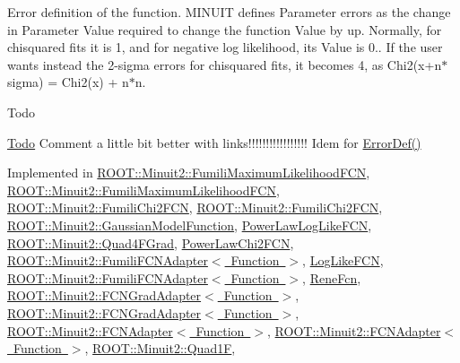 Error definition of the function. M\+I\+N\+U\+IT defines Parameter errors as the change in Parameter Value required to change the function Value by up. Normally, for chisquared fits it is 1, and for negative log likelihood, its Value is 0.. If the user wants instead the 2-\/sigma errors for chisquared fits, it becomes 4, as Chi2(x+n$\ast$sigma) = Chi2(x) + n$\ast$n.

\begin{DoxyRefDesc}{Todo}
\item[\mbox{\hyperlink{todo__todo000001}{Todo}}]Comment a little bit better with links!!!!!!!!!!!!!!!!! Idem for \mbox{\hyperlink{classROOT_1_1Minuit2_1_1FCNBase_ac4592475c58a65b037ba97ab5f3cba10}{Error\+Def()}}\end{DoxyRefDesc}


Implemented in \mbox{\hyperlink{classROOT_1_1Minuit2_1_1FumiliMaximumLikelihoodFCN_ab945da701895bfba143da08f76ba2d05}{R\+O\+O\+T\+::\+Minuit2\+::\+Fumili\+Maximum\+Likelihood\+F\+CN}}, \mbox{\hyperlink{classROOT_1_1Minuit2_1_1FumiliMaximumLikelihoodFCN_ab945da701895bfba143da08f76ba2d05}{R\+O\+O\+T\+::\+Minuit2\+::\+Fumili\+Maximum\+Likelihood\+F\+CN}}, \mbox{\hyperlink{classROOT_1_1Minuit2_1_1FumiliChi2FCN_a7e68bc2b2eb631ec52b753d7d49c4414}{R\+O\+O\+T\+::\+Minuit2\+::\+Fumili\+Chi2\+F\+CN}}, \mbox{\hyperlink{classROOT_1_1Minuit2_1_1FumiliChi2FCN_a7e68bc2b2eb631ec52b753d7d49c4414}{R\+O\+O\+T\+::\+Minuit2\+::\+Fumili\+Chi2\+F\+CN}}, \mbox{\hyperlink{classROOT_1_1Minuit2_1_1GaussianModelFunction_ae99a5c50055e4563a2252ba8ceb19d20}{R\+O\+O\+T\+::\+Minuit2\+::\+Gaussian\+Model\+Function}}, \mbox{\hyperlink{classPowerLawLogLikeFCN_ae1700e7288ed461d0e3354a2f2c5ea6a}{Power\+Law\+Log\+Like\+F\+CN}}, \mbox{\hyperlink{classROOT_1_1Minuit2_1_1Quad4FGrad_a0c477f97bac7a89bea6bdea9fdae92cf}{R\+O\+O\+T\+::\+Minuit2\+::\+Quad4\+F\+Grad}}, \mbox{\hyperlink{classPowerLawChi2FCN_ad202014937fe0e66dffc0fa9061ca9df}{Power\+Law\+Chi2\+F\+CN}}, \mbox{\hyperlink{classROOT_1_1Minuit2_1_1FumiliFCNAdapter_aeed5b77f0bcca4854a9e6b0620ab3cb9}{R\+O\+O\+T\+::\+Minuit2\+::\+Fumili\+F\+C\+N\+Adapter$<$ Function $>$}}, \mbox{\hyperlink{structLogLikeFCN_ace81f647c3b49597fdfa5a9ff88e56d4}{Log\+Like\+F\+CN}}, \mbox{\hyperlink{classROOT_1_1Minuit2_1_1FumiliFCNAdapter_aeed5b77f0bcca4854a9e6b0620ab3cb9}{R\+O\+O\+T\+::\+Minuit2\+::\+Fumili\+F\+C\+N\+Adapter$<$ Function $>$}}, \mbox{\hyperlink{classReneFcn_a5e7e439a47c37d673d9366918c74239c}{Rene\+Fcn}}, \mbox{\hyperlink{classROOT_1_1Minuit2_1_1FCNGradAdapter_a99e41f07b3f7374c0b17ef42f1c15a19}{R\+O\+O\+T\+::\+Minuit2\+::\+F\+C\+N\+Grad\+Adapter$<$ Function $>$}}, \mbox{\hyperlink{classROOT_1_1Minuit2_1_1FCNGradAdapter_a99e41f07b3f7374c0b17ef42f1c15a19}{R\+O\+O\+T\+::\+Minuit2\+::\+F\+C\+N\+Grad\+Adapter$<$ Function $>$}}, \mbox{\hyperlink{classROOT_1_1Minuit2_1_1FCNAdapter_a3bcb29efda3b97c17bb17512c1629365}{R\+O\+O\+T\+::\+Minuit2\+::\+F\+C\+N\+Adapter$<$ Function $>$}}, \mbox{\hyperlink{classROOT_1_1Minuit2_1_1FCNAdapter_a3bcb29efda3b97c17bb17512c1629365}{R\+O\+O\+T\+::\+Minuit2\+::\+F\+C\+N\+Adapter$<$ Function $>$}}, \mbox{\hyperlink{classROOT_1_1Minuit2_1_1Quad1F_a14469d6031751fa382120df6327da5ee}{R\+O\+O\+T\+::\+Minuit2\+::\+Quad1F}}, 